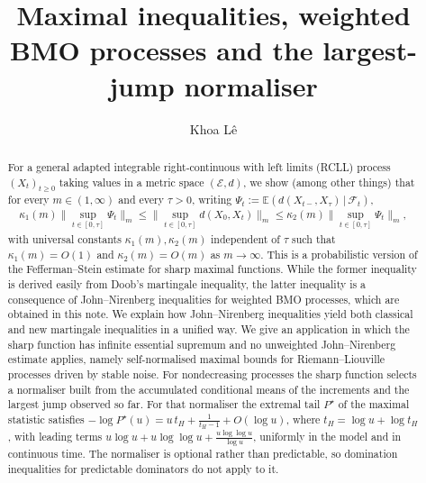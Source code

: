 \documentclass[12pt,oneside,reqno,fleqn]{amsart}
\numberwithin{equation}{section}
\theoremstyle{remark}
\newcommand{\1}{{\mathbf 1}}
\renewcommand{\le}{\leq}
\renewcommand{\ge}{\geq}
\begin{document}
	\title{Maximal inequalities, weighted BMO processes and the largest-jump normaliser}
	
\author{Khoa L{\^e} }
\address{School of Mathematics, University of Leeds, U.K.
}
	\begin{abstract}
		For a general adapted integrable right-continuous with left limits (RCLL) process $(X_t)_{t\ge0}$ taking values in a metric space $(\mathcal E,d)$, we show (among other things) that for every $m\in(1,\infty)$ and every $\tau>0$, writing $\Psi_t:=\mathbb{E}(d(X_{t-},X_\tau)\,|\,\mathcal F_t)$,
		\begin{gather*}
			\kappa_1(m)\Big\|\sup_{t\in[0,\tau]}\Psi_t\Big\|_m
			\le \Big\|\sup_{t\in[0,\tau]}d(X_0,X_t)\Big\|_m
			\le \kappa_2(m)\Big\|\sup_{t\in[0,\tau]}\Psi_t\Big\|_m,
		\end{gather*} 
		with universal constants $\kappa_1(m),\kappa_2(m)$ independent of $\tau$ such that $\kappa_1(m)=O(1)$ and $\kappa_2(m)=O(m)$ as $m\to\infty$.
		This is a probabilistic version of the Fefferman--Stein estimate for sharp maximal functions.
		While the former inequality is derived easily from Doob's martingale inequality, the latter inequality is a consequence of John--Nirenberg inequalities for weighted BMO processes, which are obtained in this note. We explain how John--Nirenberg inequalities yield both classical and new martingale inequalities in a unified way. We give an application in which the sharp function has infinite essential supremum and no unweighted John--Nirenberg estimate applies, namely self-normalised maximal bounds for Riemann--Liouville processes driven by stable noise. For nondecreasing processes the sharp function selects a normaliser built from the accumulated conditional means of the increments and the largest jump observed so far. For that normaliser the extremal tail $P^\star$ of the maximal statistic satisfies $-\log P^\star(u)=u\,t_H+\frac1{t_H-1}+O(\log u)$, where $t_H=\log u+\log t_H$, with leading terms $u\log u+u\log\log u+\frac{u\log\log u}{\log u}$, uniformly in the model and in continuous time. The normaliser is optional rather than predictable, so domination inequalities for predictable dominators do not apply to it.
	\end{abstract}
	\maketitle
\end{document}
